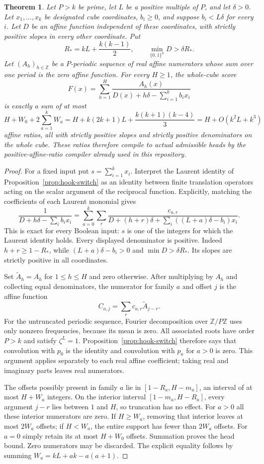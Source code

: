 \documentclass[11pt]{article}
\newtheorem{theorem}{Theorem}
\begin{document}
\begin{theorem}\label{thm:hook-repair}
Let $P>k$ be prime, let $L$ be a positive multiple of $P$, and let
$\delta>0$. Let $x_1,\ldots,x_k$ be designated cube coordinates,
$b_i\geq0$, and suppose $b_i<L\delta$ for every $i$. Let $D$ be an
affine function independent of these coordinates, with strictly
positive slopes in every other coordinate. Put
\[
 R_\ast=kL+\frac{k(k-1)}2,
 \qquad \min_{\{0,1\}^n}D>\delta R_\ast.
\]
Let $(A_h)_{h\in\mathbb Z}$ be a $P$-periodic sequence of real affine
numerators whose sum over one period is the zero affine function.
For every $H\geq1$, the whole-cube score
\[
 F(x)=\sum_{h=1}^H
 \frac{A_h(x)}{D(x)+h\delta-\sum_{i=1}^k b_ix_i}
\]
is exactly a sum of at most
\[
 H+W_0+2\sum_{a=1}^kW_a
 =H+k(2k+1)L+\frac{k(k+1)(k-4)}3
 =H+O(k^2L+k^3)
\]
affine ratios, all with strictly positive slopes and strictly
positive denominators on the whole cube. These ratios therefore
compile to actual admissible heads by the positive-affine-ratio
compiler already used in this repository.
\end{theorem}

\begin{proof}
For a fixed input put $s=\sum_{i=1}^k x_i$. Interpret the Laurent
identity of Proposition~\ref{prop:hook-switch} as an identity between
finite translation operators acting on the scalar argument of the
reciprocal function. Explicitly, matching the coefficients of each
Laurent monomial gives
\[
 \frac1{D+h\delta-\sum_i b_ix_i}
 =\sum_{a=0}^k\sum_r
 \frac{c_{a,r}}
 {D+(h+r)\delta+\sum_i((L+a)\delta-b_i)x_i}.
\]
This is exact for every Boolean input: $s$ is one of the integers
for which the Laurent identity holds. Every displayed denominator
is positive. Indeed $h+r\geq1-R_\ast$, while
$(L+a)\delta-b_i>0$ and $\min D>\delta R_\ast$.
Its slopes are strictly positive in all coordinates.

Set $\widetilde A_h=A_h$ for $1\leq h\leq H$ and zero otherwise.
After multiplying by $A_h$ and collecting equal denominators, the
numerator for family $a$ and offset $j$ is the affine function
\[
 C_{a,j}=\sum_r c_{a,r}\widetilde A_{j-r}.
\]
For the untruncated periodic sequence, Fourier decomposition over
$\mathbb Z/P\mathbb Z$ uses only nonzero frequencies, because its
mean is zero. All associated roots have order $P>k$ and satisfy
$\zeta^L=1$. Proposition~\ref{prop:hook-switch} therefore says that
convolution with $p_0$ is the identity and convolution with $p_a$
for $a>0$ is zero. This argument applies separately to each real
affine coefficient; taking real and imaginary parts leaves real
numerators.

The offsets possibly present in family $a$ lie in
$[1-R_a,H-m_a]$, an interval of at most $H+W_a$ integers. On the
interior interval $[1-m_a,H-R_a]$, every argument $j-r$ lies between
$1$ and $H$, so truncation has no effect. For $a>0$ all these
interior numerators are zero. If $H\geq W_a$, removing that
interior leaves at most $2W_a$ offsets; if $H<W_a$, the entire
support has fewer than $2W_a$ offsets. For $a=0$ simply retain its
at most $H+W_0$ offsets. Summation proves the head bound. Zero
numerators may be discarded. The explicit equality follows by
summing $W_a=kL+ak-a(a+1)$.
\end{proof}
\end{document}

